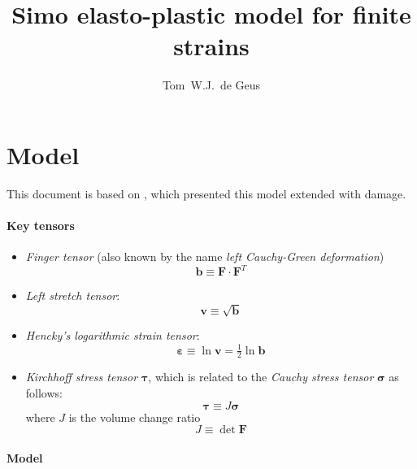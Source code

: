 \documentclass{goose-article}
\title{Simo elasto-plastic model for finite strains}
\author{Tom~W.J.\ de Geus}
\newcommand\T[1]{\bm{{#1}}}
\begin{document}
\maketitle



\section{Model}

This document is based on \citet{Geers2004}, which presented this model extended with damage.

\paragraph{Key tensors}

\begin{itemize}
  \item \emph{Finger tensor} (also known by the name \emph{left Cauchy-Green deformation})
  \begin{equation}
    \T{b} \equiv \T{F} \cdot \T{F}^T
  \end{equation}
  \item \emph{Left stretch tensor}:
  \begin{equation}
    \T{v} \equiv \sqrt{\T{b}}
  \end{equation}
  \item \emph{Hencky’s logarithmic strain tensor}:
  \begin{equation}
    \T{\varepsilon} \equiv \ln \T{v} = \tfrac{1}{2} \ln \T{b}
  \end{equation}
  \item \emph{Kirchhoff stress tensor} $\T{\tau}$, which is related to the \emph{Cauchy stress tensor} $\T{\sigma}$ as follows:
  \begin{equation}
    \T{\tau} \equiv J \T{\sigma}
  \end{equation}
  where $J$ is the volume change ratio
  \begin{equation}
    J \equiv \det \T{F}
  \end{equation}
\end{itemize}

\paragraph{Model}
\end{document}
